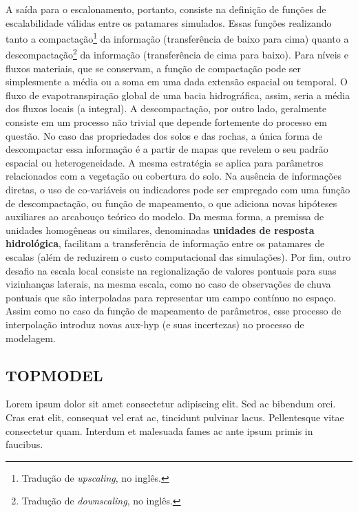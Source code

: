 \documentclass[./main.tex]{subfiles}
\begin{document}
\par A saída para o escalonamento, portanto, consiste na definição de funções de escalabilidade válidas entre os patamares simulados. Essas funções realizando tanto a compactação\footnote{Tradução de \textit{upscaling}, no inglês.} da informação (transferência de baixo para cima) quanto a descompactação\footnote{Tradução de \textit{downscaling}, no inglês.} da informação (transferência de cima para baixo). Para níveis e fluxos materiais, que se conservam, a função de compactação pode ser simplesmente a média ou a soma em uma dada extensão espacial ou temporal. O fluxo de evapotranspiração global de uma bacia hidrográfica, assim, seria a média dos fluxos locais (a integral). A descompactação, por outro lado, geralmente consiste em um processo não trivial que depende fortemente do processo em questão. No caso das propriedades dos solos e das rochas, a única forma de descompactar essa informação é a partir de mapas que revelem o seu padrão espacial ou heterogeneidade. A mesma estratégia se aplica para parâmetros relacionados com a vegetação ou cobertura do solo. Na ausência de informações diretas, o uso de co-variáveis ou indicadores pode ser empregado com uma função de descompactação, ou função de mapeamento, o que adiciona novas hipóteses auxiliares ao arcabouço teórico do modelo. Da mesma forma, a premissa de unidades homogêneas ou similares, denominadas \textbf{unidades de resposta hidrológica}, facilitam a transferência de informação entre os patamares de escalas (além de reduzirem o custo computacional das simulações). Por fim, outro desafio na escala local consiste na regionalização de valores pontuais para suas vizinhanças laterais, na mesma escala, como no caso de observações de chuva pontuais que são interpoladas para representar um campo contínuo no espaço. Assim como no caso da função de mapeamento de parâmetros, esse processo de interpolação introduz novas \gls{aux-hyp} (e suas incertezas) no processo de modelagem.

\subsection{TOPMODEL} \label{sec:hydro:topmodel}

\par Lorem ipsum dolor sit amet consectetur adipiscing elit. Sed ac bibendum orci. Cras erat elit, consequat vel erat ac, tincidunt pulvinar lacus. Pellentesque vitae consectetur quam. Interdum et malesuada fames ac ante ipsum primis in faucibus.
\end{document}
